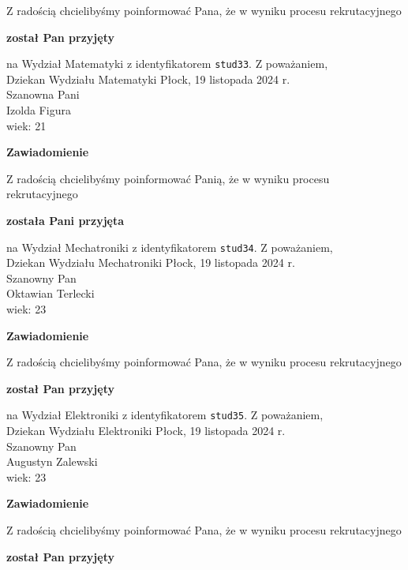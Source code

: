 \documentclass[12pt,a4paper]{article}
\begin{document}
\bigskip 
Z radością chcielibyśmy poinformować Pana, że w wyniku procesu rekrutacyjnego
\begin{center}
\textsf{\textbf{został Pan przyjęty}}
\end{center}
na Wydział Matematyki z identyfikatorem \verb|stud33|. 
\vspace{2cm}
\noindent
Z poważaniem, \\
Dziekan
Wydziału Matematyki
\newpage
\hfill Płock, 19 listopada 2024 r. \\
\noindent
Szanowna Pani \\
Izolda Figura \\
wiek: 21
\bigskip
\begin{center}
    {\Large\textbf{Zawiadomienie}}
\end{center}
\bigskip 
Z radością chcielibyśmy poinformować Panią, że w wyniku procesu rekrutacyjnego
\begin{center}
\textsf{\textbf{została Pani przyjęta}}
\end{center}
na Wydział Mechatroniki z identyfikatorem \verb|stud34|. 
\vspace{2cm}
\noindent
Z poważaniem, \\
Dziekan
Wydziału Mechatroniki
\newpage
\hfill Płock, 19 listopada 2024 r. \\
\noindent
Szanowny Pan \\
Oktawian Terlecki \\
wiek: 23
\bigskip
\begin{center}
    {\Large\textbf{Zawiadomienie}}
\end{center}
\bigskip 
Z radością chcielibyśmy poinformować Pana, że w wyniku procesu rekrutacyjnego
\begin{center}
\textsf{\textbf{został Pan przyjęty}}
\end{center}
na Wydział Elektroniki z identyfikatorem \verb|stud35|. 
\vspace{2cm}
\noindent
Z poważaniem, \\
Dziekan
Wydziału Elektroniki
\newpage
\hfill Płock, 19 listopada 2024 r. \\
\noindent
Szanowny Pan \\
Augustyn Zalewski \\
wiek: 23
\bigskip
\begin{center}
    {\Large\textbf{Zawiadomienie}}
\end{center}
\bigskip 
Z radością chcielibyśmy poinformować Pana, że w wyniku procesu rekrutacyjnego
\begin{center}
\textsf{\textbf{został Pan przyjęty}}
\end{center}
\end{document}
